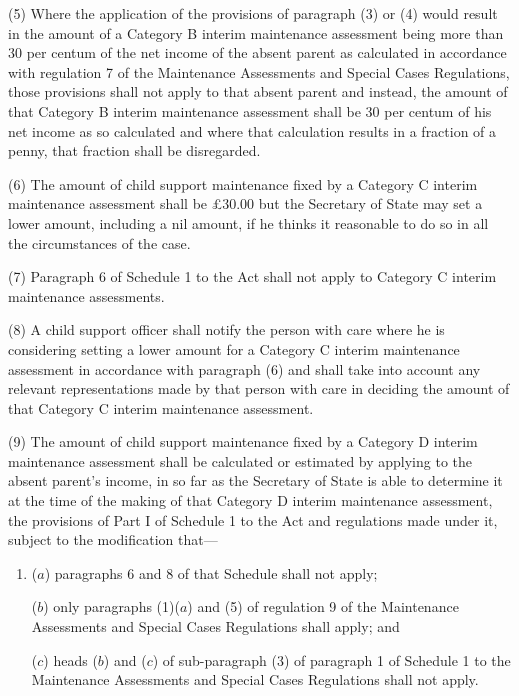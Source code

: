 \documentclass[a4paper,12pt]{article}
\begin{document}
(5) Where the application of the provisions of paragraph (3) or (4) would result in the amount of a Category B interim maintenance assessment being more than 30 per centum of the net income of the absent parent as calculated in accordance with regulation 7 of the Maintenance Assessments and Special Cases Regulations, those provisions shall not apply to that absent parent and instead, the amount of that Category B interim maintenance assessment shall be 30 per centum of his net income as so calculated and where that calculation results in a fraction of a penny, that fraction shall be disregarded.

(6) The amount of child support maintenance fixed by a Category C interim maintenance assessment shall be £30.00 but 
the Secretary of State  %
may set a lower amount, including a nil amount, if he thinks it reasonable to do so in all the circumstances of the case.

(7) Paragraph 6 of Schedule 1 to the Act shall not apply to Category C interim maintenance assessments.

(8) A child support officer shall notify the person with care where he is considering setting a lower amount for a Category C interim maintenance assessment in accordance with paragraph (6) and shall take into account any relevant representations made by that person with care in deciding the amount of that Category C interim maintenance assessment.

(9) The amount of child support maintenance fixed by a Category D interim maintenance assessment shall be calculated or estimated by applying to the absent parent’s income, in so far as 
the Secretary of State  %
is able to determine it at the time of the making of that Category D interim maintenance assessment, the provisions of Part I of Schedule 1 to the Act and regulations made under it, subject to the modification that—
\begin{enumerate}\item[]
($a$) paragraphs 6 and 8 of that Schedule shall not apply;

($b$) only paragraphs (1)($a$) and (5) of regulation 9 of the Maintenance Assessments and Special Cases Regulations shall apply; and

($c$) heads ($b$) and ($c$) of sub-paragraph (3) of paragraph 1 of Schedule 1 to the Maintenance Assessments and Special Cases Regulations shall not apply.
\end{enumerate}
\end{document}
